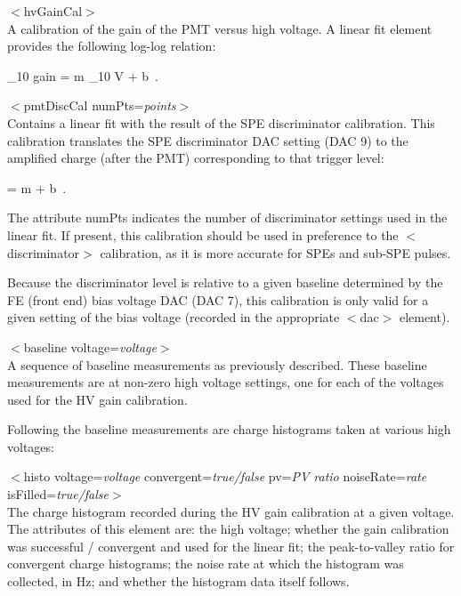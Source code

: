 \documentclass[10pt]{article}
\begin{document}
\item{$<$hvGainCal$>$}\\ 
A calibration of the gain of the PMT versus high voltage.  A linear fit
element provides the following log-log relation:

\be
\log_{10} gain = m \cdot \log_{10} V + b\ .
\ee


\item{$<$pmtDiscCal numPts=\textit{points}$>$}\\
Contains a linear fit with the result of the SPE discriminator calibration.
This calibration translates the SPE discriminator DAC setting (DAC 9) to
the amplified charge (after the PMT) corresponding to that trigger level:

\be
{} = m \cdot {} + b\ .
\ee

The attribute numPts indicates the number of discriminator settings used in
the linear fit.  If present,
this calibration should be used in preference to the $<$discriminator$>$
calibration, as it is more accurate for SPEs and sub-SPE pulses.  

Because the discriminator level is relative to a given baseline
determined by the FE (front end) bias voltage DAC (DAC 7), this calibration
is only valid for a given setting of the bias voltage (recorded in the
appropriate $<$dac$>$ element). 


\item{$<$baseline voltage=\textit{voltage}$>$}\\
A sequence of baseline measurements as previously described.  These
baseline measurements are at non-zero high voltage settings, one for each
of the voltages used for the HV gain calibration.

Following the baseline measurements are charge histograms taken at various
high voltages:

\item{$<$histo voltage=\textit{voltage} convergent=\textit{true/false}
  pv=\textit{PV ratio} noiseRate=\textit{rate}
  isFilled=\textit{true/false}$>$}\\ 

The charge histogram recorded during the HV gain calibration at a given
voltage.  The attributes of this element are: the high voltage; whether the
gain calibration was successful / convergent and used for the linear fit;
the peak-to-valley ratio for convergent charge histograms; the noise rate
at which the histogram was collected, in Hz; and whether the histogram data
itself follows.
\end{document}
